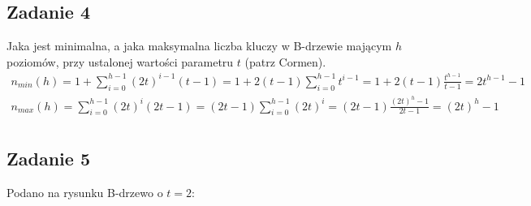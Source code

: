 \documentclass{article}
\begin{document}
\subsection*{Zadanie 4}
Jaka jest minimalna, a jaka maksymalna liczba kluczy w B-drzewie mającym $h$ poziomów, przy ustalonej wartości
parametru $t$ (patrz Cormen).
\begin{gather*}
    n_{min}(h) = 1 + \sum_{i=0}^{h-1} (2t)^{i-1}(t-1) = 1 + 2(t-1) \sum_{i=0}^{h-1} t^{i-1} = 1 + 2(t-1)
    \frac{t^{h-1}}{t-1} = 2t^{h-1} - 1 \\
    n_{max}(h) = \sum_{i=0}^{h-1} (2t)^i(2t-1) = (2t-1) \sum_{i=0}^{h-1} (2t)^i = (2t-1) \frac{(2t)^h-1}{2t-1} =
    (2t)^h-1 \\
\end{gather*}

\subsection*{Zadanie 5}
Podano na rysunku B-drzewo o $t=2$:
\end{document}
